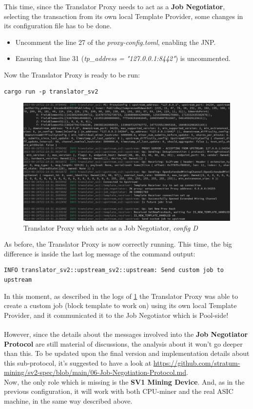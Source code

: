 This time, since the Translator Proxy needs to act as a \textbf{Job Negotiator}, selecting the transaction from its own local Template Provider, some changes in its configuration file has to be done.
\begin{itemize}
    \item Uncomment the line 27 of the \textit{proxy-config.toml}, enabling the JNP. 
    \item Ensuring that line 31 (\textit{tp\_address = "127.0.0.1:8442"}) is uncommented. 
\end{itemize}
Now the Translator Proxy is ready to be run:
\begin{lstlisting}[style=bashStyle, numbers=none]
    cargo run -p translator_sv2 
\end{lstlisting}
\begin{figure}[h!]
    \centering
    \includegraphics[width=14.5cm]{Figures/sri/configD_2.png}
    \caption{Translator Proxy which acts as a Job Negotiator, \textit{config D}}
    \label{fig:configD_3}
\end{figure}
As before, the Translator Proxy is now correctly running. This time, the big difference is inside the last log message of the command output:
\begin{lstlisting}[style=bashStyle, numbers=none]
    INFO translator_sv2::upstream_sv2::upstream: Send custom job to upstream
\end{lstlisting}

\noindent In this moment, as described in the logs of \ref{fig:configD_3} the Translator Proxy was able to create a custom job (block template to work on) using its own local Template Provider, and it communicated it to the Job Negotiator which is Pool-side!\\\\
However, since the details about the messages involved into the \textbf{Job Negotiator Protocol} are still material of discussions, the analysis about it won't go deeper than this. To be updated upon the final version and implementation details about this sub-protocol, it's suggested to have a look at \href{https://github.com/stratum-mining/sv2-spec/blob/main/06-Job-Negotiation-Protocol.md}{https://github.com/stratum-mining/sv2-spec/blob/main/06-Job-Negotiation-Protocol.md}.\\

\noindent Now, the only role which is missing is the \textbf{SV1 Mining Device}. And, as in the previous configuration, it will work with both CPU-miner and the real ASIC machine, in the same way described above.
